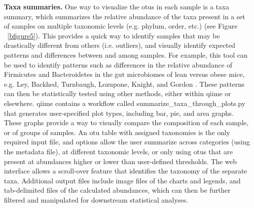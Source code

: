 \textbf{Taxa summaries.} One way to visualize the \gls{otu}s in each sample is a taxa
summary, which summarizes the relative abundance of the taxa present in a set of
samples on multiple taxonomic levels (e.g. phylum, order, etc.) (see Figure ~\ref{bfigure5}).
This provides a quick way to identify samples that may be drastically different from others
(i.e. outliers), and visually identify expected patterns and differences between and among samples.
For example, this tool can be used to identify patterns such as differences in the
relative abundance of Firmicutes and Bacteroidetes in the gut microbiomes of lean versus
obese mice, e.g. Ley, Backhed, Turnbaugh, Lozupone, Knight, and Gordon \cite{Ley2008}.
These patterns can then be statistically tested using other methods, either within \gls{qiime} or
elsewhere. \gls{qiime} contains a workflow called summarize\_taxa\_through\_plots.py that generates
user-specified plot types, including bar, pie, and area graphs. These graphs provide a way to
visually compare the composition of each sample, or of groups of samples. An \gls{otu} table
with assigned taxonomies is the only required input file, and options allow the user
summarize across categories (using the metadata file), at different taxonomic levels, or
only using \gls{otu}s that are present at abundances higher or lower than user-defined thresholds.
The web interface allows a scroll-over feature that identifies the taxonomy of the separate taxa.
Additional output files include image files of the charts and legends, and tab-delimited files
of the calculated abundances, which can then be further filtered and manipulated for
downstream statistical analyses.

